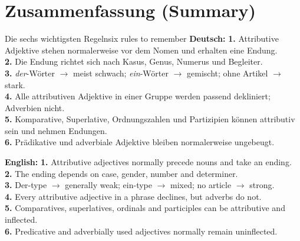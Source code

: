 \documentclass[a4paper,11pt]{article}
\newcommand{\GermanText}[1]{\textbf{Deutsch: }#1\par}
\newcommand{\EnglishText}[1]{{\small\color{SoftGray}\textbf{English: }#1\par}}
\begin{document}
\section{Zusammenfassung \textnormal{(Summary)}}
\begin{grammarentry}{Die sechs wichtigsten Regeln}{six rules to remember}
\GermanText{\textbf{1.} Attributive Adjektive stehen normalerweise vor dem Nomen und erhalten eine Endung.\\
\textbf{2.} Die Endung richtet sich nach Kasus, Genus, Numerus und Begleiter.\\
\textbf{3.} \emph{der}-Wörter $\rightarrow$ meist schwach; \emph{ein}-Wörter $\rightarrow$ gemischt; ohne Artikel $\rightarrow$ stark.\\
\textbf{4.} Alle attributiven Adjektive in einer Gruppe werden passend dekliniert; Adverbien nicht.\\
\textbf{5.} Komparative, Superlative, Ordnungszahlen und Partizipien können attributiv sein und nehmen Endungen.\\
\textbf{6.} Prädikative und adverbiale Adjektive bleiben normalerweise ungebeugt.}
\EnglishText{\textbf{1.} Attributive adjectives normally precede nouns and take an ending.\\
\textbf{2.} The ending depends on case, gender, number and determiner.\\
\textbf{3.} Der-type $\rightarrow$ generally weak; ein-type $\rightarrow$ mixed; no article $\rightarrow$ strong.\\
\textbf{4.} Every attributive adjective in a phrase declines, but adverbs do not.\\
\textbf{5.} Comparatives, superlatives, ordinals and participles can be attributive and inflected.\\
\textbf{6.} Predicative and adverbially used adjectives normally remain uninflected.}
\end{grammarentry}
\end{document}
